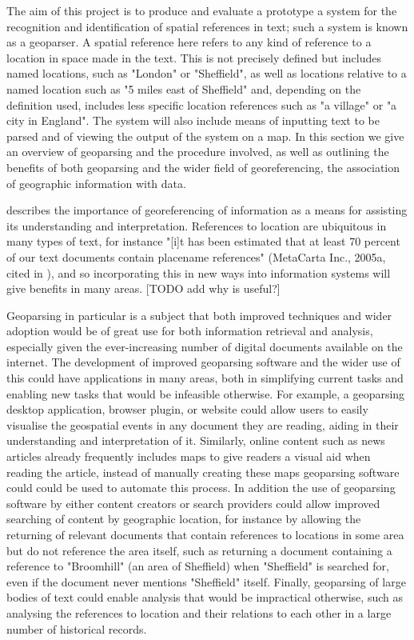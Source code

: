 \documentclass[12pt, a4paper]{report}
\begin{document}
The aim of this project is to produce and evaluate a prototype a system for the recognition and identification of spatial references in text; such a system is known as a geoparser. A spatial reference here refers to any kind of reference to a location in space made in the text. This is not precisely defined but includes named locations, such as "London" or "Sheffield", as well as locations relative to a named location such as "5 miles east of Sheffield" and, depending on the definition used, includes less specific location references such as "a village" or "a city in England". The system will also include means of inputting text to be parsed and of viewing the output of the system on a map. In this section we give an overview of geoparsing and the procedure involved, as well as outlining the benefits of both geoparsing and the wider field of georeferencing, the association of geographic information with data. 

\citet{hill2006} describes the importance of georeferencing of information as a means for assisting its understanding and interpretation. References to location are ubiquitous in many types of text, for instance "[i]t has been estimated that at least 70 percent of our text documents contain placename references" (MetaCarta Inc., 2005a, cited in \citet[p.~5]{hill2006}), and so incorporating this in new ways into information systems will give benefits in many areas. [TODO add why is useful?]

Geoparsing in particular is a subject that both improved techniques and wider adoption would be of great use for both information retrieval and analysis, especially given the ever-increasing number of digital documents available on the internet. The development of improved geoparsing software and the wider use of this could have applications in many areas, both in simplifying current tasks and enabling new tasks that would be infeasible otherwise. For example, a geoparsing desktop application, browser plugin, or website could allow users to easily visualise the geospatial events in any document they are reading, aiding in their understanding and interpretation of it. Similarly, online content such as news articles already frequently includes maps to give readers a visual aid when reading the article, instead of manually creating these maps geoparsing software could could be used to automate this process. In addition the use of geoparsing software by either content creators or search providers could allow improved searching of content by geographic location, for instance by allowing the returning of relevant documents that contain references to locations in some area but do not reference the area itself, such as returning a document containing a reference to "Broomhill" (an area of Sheffield) when "Sheffield" is searched for, even if the document never mentions "Sheffield" itself. Finally, geoparsing of large bodies of text could enable analysis that would be impractical otherwise, such as analysing the references to location and their relations to each other in a large number of historical records.
\end{document}
